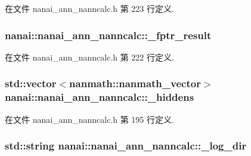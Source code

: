 在文件 nanai\+\_\+ann\+\_\+nanncalc.\+h 第 223 行定义.

\hypertarget{classnanai_1_1nanai__ann__nanncalc_afdaafe5d48d6590d9c38b020452eabce}{}
\subsubsection[{\+\_\+fptr\+\_\+result}]{ nanai\+::nanai\+\_\+ann\+\_\+nanncalc\+::\+\_\+fptr\+\_\+result\hspace{0.3cm}{\ttfamily [protected]}}\label{classnanai_1_1nanai__ann__nanncalc_afdaafe5d48d6590d9c38b020452eabce}


在文件 nanai\+\_\+ann\+\_\+nanncalc.\+h 第 222 行定义.

\hypertarget{classnanai_1_1nanai__ann__nanncalc_a1e15116b2a2d7b5c8ddb9579de11f5ae}{}
\subsubsection[{\+\_\+hiddens}]{\setlength{\rightskip}{0pt plus 5cm}std\+::vector$<${\bf nanmath\+::nanmath\+\_\+vector}$>$ nanai\+::nanai\+\_\+ann\+\_\+nanncalc\+::\+\_\+hiddens\hspace{0.3cm}{\ttfamily [protected]}}\label{classnanai_1_1nanai__ann__nanncalc_a1e15116b2a2d7b5c8ddb9579de11f5ae}


在文件 nanai\+\_\+ann\+\_\+nanncalc.\+h 第 195 行定义.

\hypertarget{classnanai_1_1nanai__ann__nanncalc_ad02491864e160b837d6b84f635f5947a}{}
\subsubsection[{\+\_\+log\+\_\+dir}]{\setlength{\rightskip}{0pt plus 5cm}std\+::string nanai\+::nanai\+\_\+ann\+\_\+nanncalc\+::\+\_\+log\+\_\+dir\hspace{0.3cm}{\ttfamily [protected]}}\label{classnanai_1_1nanai__ann__nanncalc_ad02491864e160b837d6b84f635f5947a}



